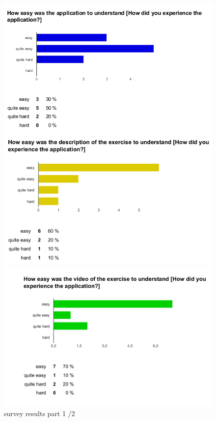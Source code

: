 \begin{figure}[b!]
  \centering
    \begin{minipage}{0.3\textwidth}
      \centering
        \includegraphics[width=1\textwidth]{00_resources/figures/survey_results1.png}
    \end{minipage}
    \begin{minipage}{0.3\textwidth}
      \centering
        \includegraphics[width=1\textwidth]{00_resources/figures/survey_results2.png}
    \end{minipage}
    \begin{minipage}{0.3\textwidth}
      \centering
        \includegraphics[width=1\textwidth]{00_resources/figures/survey_results3.png}
    \end{minipage}
  \caption{survey results part 1 /2 }
  \label{fig:survey1}
\end{figure}
